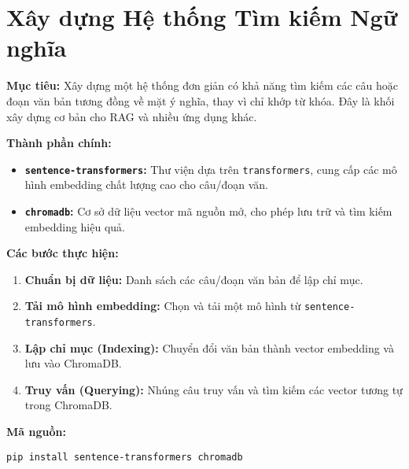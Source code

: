 
\section{Xây dựng Hệ thống Tìm kiếm Ngữ nghĩa}
\label{sec:semantic_search}

\textbf{Mục tiêu:} Xây dựng một hệ thống đơn giản có khả năng tìm kiếm các câu hoặc đoạn văn bản tương đồng về mặt ý nghĩa, thay vì chỉ khớp từ khóa. Đây là khối xây dựng cơ bản cho RAG và nhiều ứng dụng khác.

\textbf{Thành phần chính:}
\begin{itemize}
    \item \textbf{\texttt{sentence-transformers}:} Thư viện dựa trên \texttt{transformers}, cung cấp các mô hình embedding chất lượng cao cho câu/đoạn văn.
    \item \textbf{\texttt{chromadb}:} Cơ sở dữ liệu vector mã nguồn mở, cho phép lưu trữ và tìm kiếm embedding hiệu quả.
\end{itemize}

\textbf{Các bước thực hiện:}
\begin{enumerate}
    \item \textbf{Chuẩn bị dữ liệu:} Danh sách các câu/đoạn văn bản để lập chỉ mục.
    \item \textbf{Tải mô hình embedding:} Chọn và tải một mô hình từ \texttt{sentence-transformers}.
    \item \textbf{Lập chỉ mục (Indexing):} Chuyển đổi văn bản thành vector embedding và lưu vào ChromaDB.
    \item \textbf{Truy vấn (Querying):} Nhúng câu truy vấn và tìm kiếm các vector tương tự trong ChromaDB.
\end{enumerate}

\textbf{Mã nguồn:}

\noindent
\colorbox{gray!20}{\texttt{pip install sentence-transformers chromadb}}

